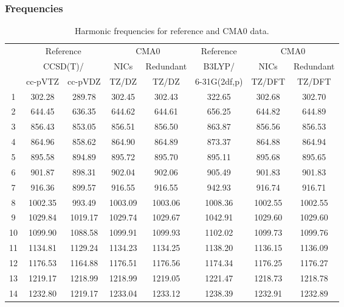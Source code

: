 \documentclass[10pt,oneside]{article}
\begin{document}
\begin{table}[h!]
\subsubsection*{Frequencies}
\centering
\caption{Harmonic frequencies for reference and CMA0 data.}
\begin{tabular}{cccccccc}
\toprule
{} & \multicolumn{2}{c}{Reference} & \multicolumn{2}{c}{CMA0} &    Reference & \multicolumn{2}{c}{CMA0} \\
{} & \multicolumn{2}{c}{CCSD(T)/} &    NICs &  Redundant &       B3LYP/ &    NICs & Redundant \\
{} &   cc-pVTZ & cc-pVDZ &   TZ/DZ &      TZ/DZ & 6-31G(2df,p) &  TZ/DFT &    TZ/DFT \\
\midrule
1  &    302.28 &  289.78 &  302.45 &     302.43 &       322.65 &  302.68 &    302.70 \\
2  &    644.45 &  636.35 &  644.62 &     644.61 &       656.25 &  644.82 &    644.89 \\
3  &    856.43 &  853.05 &  856.51 &     856.50 &       863.87 &  856.56 &    856.53 \\
4  &    864.96 &  858.62 &  864.90 &     864.89 &       873.37 &  864.88 &    864.94 \\
5  &    895.58 &  894.89 &  895.72 &     895.70 &       895.11 &  895.68 &    895.65 \\
6  &    901.87 &  898.31 &  902.04 &     902.06 &       905.49 &  901.83 &    901.83 \\
7  &    916.36 &  899.57 &  916.55 &     916.55 &       942.93 &  916.74 &    916.71 \\
8  &   1002.35 &  993.49 & 1003.09 &    1003.06 &      1008.36 & 1002.55 &   1002.55 \\
9  &   1029.84 & 1019.17 & 1029.74 &    1029.67 &      1042.91 & 1029.60 &   1029.60 \\
10 &   1099.90 & 1088.58 & 1099.91 &    1099.93 &      1102.02 & 1099.73 &   1099.76 \\
11 &   1134.81 & 1129.24 & 1134.23 &    1134.25 &      1138.20 & 1136.15 &   1136.09 \\
12 &   1176.53 & 1164.88 & 1176.51 &    1176.56 &      1174.34 & 1176.25 &   1176.27 \\
13 &   1219.17 & 1218.99 & 1218.99 &    1219.05 &      1221.47 & 1218.73 &   1218.78 \\
14 &   1232.80 & 1219.17 & 1233.04 &    1233.12 &      1238.39 & 1232.91 &   1232.89 \\

\end{tabular}
\end{table}
\end{document}
